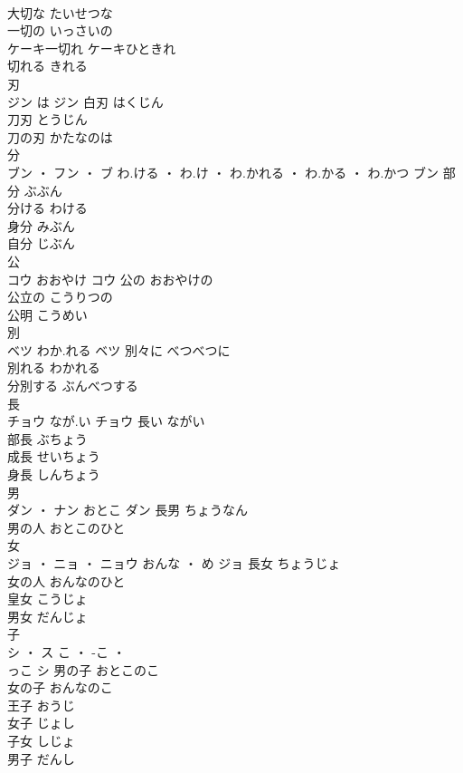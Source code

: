 \documentclass[8pt]{extreport}
\begin{document}
\begin{CJK}{UTF8}{min}
\\	大切な	たいせつな	
\\	一切の	いっさいの	
\\	ケーキ一切れ	ケーキひときれ	
\\	切れる	きれる	
\\	刃	
\\	ジン	は	ジン	白刃	はくじん	
\\	刀刃	とうじん	
\\	刀の刃	かたなのは	
\\	分	
\\	ブン ・ フン ・ ブ	わ.ける ・ わ.け ・ わ.かれる ・ わ.かる ・ わ.かつ	ブン	部分	ぶぶん	
\\	分ける	わける	
\\	身分	みぶん	
\\	自分	じぶん	
\\	公	
\\	コウ	おおやけ	コウ	公の	おおやけの	
\\	公立の	こうりつの	
\\	公明	こうめい	
\\	別	
\\	ベツ	わか.れる	ベツ	別々に	べつべつに	
\\	別れる	わかれる	
\\	分別する	ぶんべつする	
\\	長	
\\	チョウ	なが.い	チョウ	長い	ながい	
\\	部長	ぶちょう	
\\	成長	せいちょう	
\\	身長	しんちょう	
\\	男	
\\	ダン ・ ナン	おとこ	ダン	長男	ちょうなん	
\\	男の人	おとこのひと	
\\	女	
\\	ジョ ・ ニョ ・ ニョウ	おんな ・ め	ジョ	長女	ちょうじょ	
\\	女の人	おんなのひと	
\\	皇女	こうじょ	
\\	男女	だんじょ	
\\	子	
\\	シ ・ ス	こ ・ -こ ・ 
\\	っこ	シ	男の子	おとこのこ	
\\	女の子	おんなのこ	
\\	王子	おうじ	
\\	女子	じょし	
\\	子女	しじょ	
\\	男子	だんし	

\end{CJK}
\end{document}
